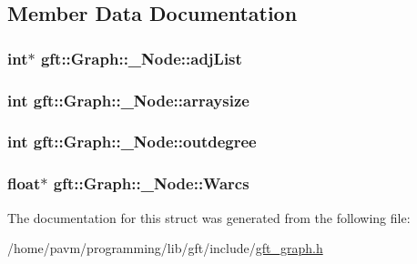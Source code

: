 \subsection{Member Data Documentation}
\hypertarget{structgft_1_1Graph_1_1__Node_a50c5a52bde74c61eb535531e3b24146a}{
\subsubsection[{adj\-List}]{\setlength{\rightskip}{0pt plus 5cm}int$\ast$ gft\-::\-Graph\-::\-\_\-\-Node\-::adj\-List}}\label{structgft_1_1Graph_1_1__Node_a50c5a52bde74c61eb535531e3b24146a}
\hypertarget{structgft_1_1Graph_1_1__Node_a3bf441dbd3109bb46136c4e413015cc3}{
\subsubsection[{arraysize}]{\setlength{\rightskip}{0pt plus 5cm}int gft\-::\-Graph\-::\-\_\-\-Node\-::arraysize}}\label{structgft_1_1Graph_1_1__Node_a3bf441dbd3109bb46136c4e413015cc3}
\hypertarget{structgft_1_1Graph_1_1__Node_ace8a528045d81543c6fe13a62d0bfb0d}{
\subsubsection[{outdegree}]{\setlength{\rightskip}{0pt plus 5cm}int gft\-::\-Graph\-::\-\_\-\-Node\-::outdegree}}\label{structgft_1_1Graph_1_1__Node_ace8a528045d81543c6fe13a62d0bfb0d}
\hypertarget{structgft_1_1Graph_1_1__Node_ae10ad39ff558acecac377de3a58da919}{
\subsubsection[{Warcs}]{\setlength{\rightskip}{0pt plus 5cm}float$\ast$ gft\-::\-Graph\-::\-\_\-\-Node\-::\-Warcs}}\label{structgft_1_1Graph_1_1__Node_ae10ad39ff558acecac377de3a58da919}


The documentation for this struct was generated from the following file\-:\begin{DoxyCompactItemize}
\item 
/home/pavm/programming/lib/gft/include/\hyperlink{gft__graph_8h}{gft\-\_\-graph.\-h}\end{DoxyCompactItemize}
